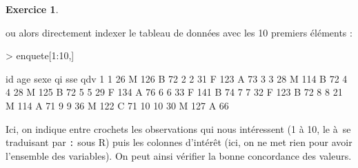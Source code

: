 \documentclass[11pt]{report}
\makeatletter
\theoremstyle{definition}
\newtheorem{exo}{Exercice}[chapter]
\newcommand{\foo}[1]{\texttt{#1}}
\newcommand{\cmd}[1]{\index{#1@\foo{#1}}}
\makeatother
\begin{document}
\begin{exo}
\begin{sol}
\begin{Schunk}
\end{Schunk}
\cmd{head}
ou alors directement indexer le tableau de données avec les 10 premiers
éléments : 
\begin{Schunk}
\begin{Sinput}
> enquete[1:10,]
\end{Sinput}
\begin{Soutput}
   id age sexe  qi sse qdv
1   1  26    M 126   B  72
2   2  31    F 123   A  73
3   3  28    M 114   B  72
4   4  28    M 125   B  72
5   5  29    F 134   A  76
6   6  33    F 141   B  74
7   7  32    F 123   B  72
8   8  21    M 114   A  71
9   9  36    M 122   C  71
10 10  30    M 127   A  66
\end{Soutput}
\end{Schunk}
Ici, on indique entre crochets les observations qui nous intéressent (1 à
10, le \og à\fg\ se traduisant par \texttt{:} sous R) puis les colonnes
d'intérêt (ici, on ne met rien pour avoir l'ensemble des variables). On peut
ainsi vérifier la bonne concordance des valeurs.


\end{sol}
\end{exo}
\end{document}
